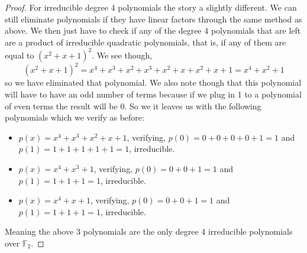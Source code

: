 \documentclass[11pt]{article}
\begin{document}
\begin{proof}
        For irreducible degree 4 polynomials the story a slightly different. We can still eliminate polynomials if they have linear factors through the same method as above. We then just have to check if any of the degree 4 polynomials that are left are a product of irreducible quadratic polynomials, that is, if any of them are equal to $(x^{2} + x + 1)^{2}$. We see though,
        \[(x^{2} + x + 1)^{2} = x^{4} + x^{3} + x^{2} + x^{3} + x^{2} + x + x^{2} + x + 1 = x^{4}+  x^{2} + 1\]
        so we have eliminated that polynomial. We also note though that this polynomial will have to have an odd number of terms because if we plug in 1 to a polynomial of even terms the result will be 0. So we it leaves us with the following polynomials which we verify as before:
        \begin{itemize}
            \item $p(x) = x^{4} + x^{3} + x^{2} + x + 1$, verifying, $p(0) = 0 + 0 + 0 + 0 + 1 = 1$ and $p(1) = 1 + 1 + 1 + 1 + 1 = 1$, irreducible.
            \item $p(x) = x^{4} + x^{3} + 1$, verifying, $p(0) = 0 + 0 + 1 = 1$ and $p(1) = 1 + 1 + 1 = 1$, irreducible.
            \item $p(x) = x^{4} + x + 1$, verifying, $p(0) = 0 + 0 + 1 = 1$ and $p(1) = 1 + 1 + 1 = 1$, irreducible. 
        \end{itemize}
        Meaning the above 3 polynomials are the only degree 4 irreducible polynomials over $\mathbb{F}_2$. 


\end{proof}
\end{document}

